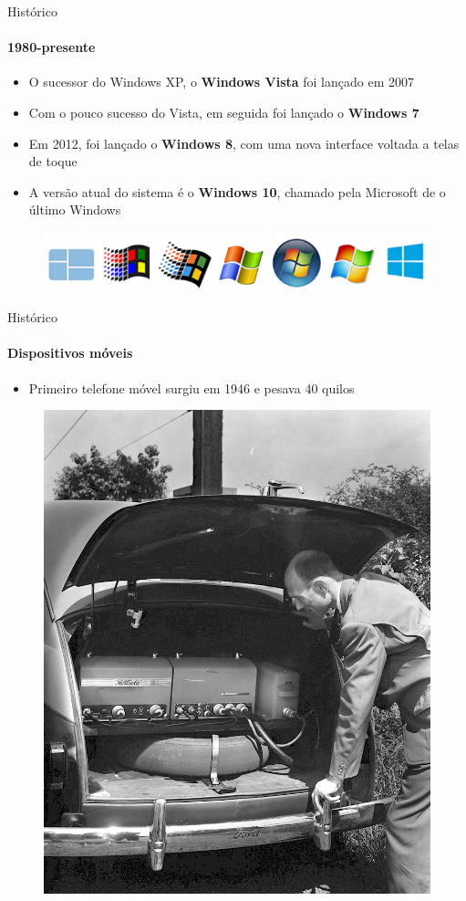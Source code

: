 \documentclass{beamer}
\begin{document}
\begin{frame}{Histórico}
	\framesubtitle{1980-presente}
	\begin{itemize}
		\item O sucessor do Windows XP, o \textbf{Windows Vista} foi lançado em 2007
		\item Com o pouco sucesso do Vista, em seguida foi lançado o \textbf{Windows 7}
		\item Em 2012, foi lançado o \textbf{Windows 8}, com uma nova interface voltada a telas de toque
		\item A versão atual do sistema é o \textbf{Windows 10}, chamado pela Microsoft de \alert{o último Windows}
	\end{itemize}
	\begin{figure}
		\includegraphics[width=0.8\paperwidth]{resources/windows}
	\end{figure}
\end{frame}
\begin{frame}{Histórico}
	\framesubtitle{Dispositivos móveis}
	\begin{itemize}
		\item Primeiro telefone móvel surgiu em 1946 e pesava 40 quilos

	\end{itemize}
	\begin{figure}
		\includegraphics[width=0.35\paperwidth]{resources/movel}
	\end{figure}
\end{frame}
\end{document}

